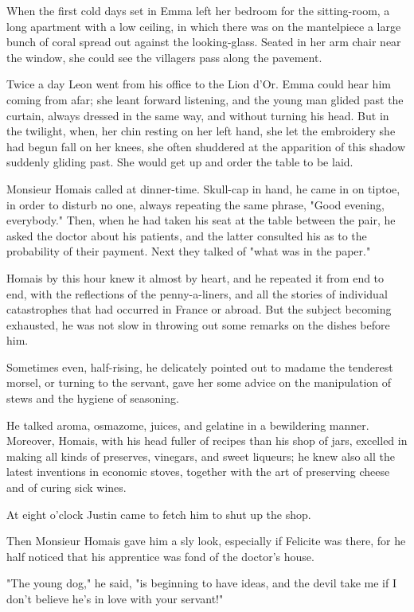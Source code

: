 \documentclass[11pt,twocolumn]{ltugboat}
\begin{document}
When the first cold days set in Emma left her bedroom for the
sitting-room, a long apartment with a low ceiling, in which there was
on the mantelpiece a large bunch of coral spread out against the
looking-glass. Seated in her arm chair near the window, she could see
the villagers pass along the pavement.

Twice a day Leon went from his office to the Lion d'Or. Emma could hear
him coming from afar; she leant forward listening, and the young man
glided past the curtain, always dressed in the same way, and without
turning his head. But in the twilight, when, her chin resting on her
left hand, she let the embroidery she had begun fall on her knees, she
often shuddered at the apparition of this shadow suddenly gliding past.
She would get up and order the table to be laid.

Monsieur Homais called at dinner-time. Skull-cap in hand, he came in on
tiptoe, in order to disturb no one, always repeating the same phrase,
"Good evening, everybody." Then, when he had taken his seat at the table
between the pair, he asked the doctor about his patients, and the latter
consulted his as to the probability of their payment. Next they talked
of "what was in the paper."

Homais by this hour knew it almost by heart, and he repeated it from end
to end, with the reflections of the penny-a-liners, and all the stories
of individual catastrophes that had occurred in France or abroad. But
the subject becoming exhausted, he was not slow in throwing out some
remarks on the dishes before him.

Sometimes even, half-rising, he delicately pointed out to madame the
tenderest morsel, or turning to the servant, gave her some advice on the
manipulation of stews and the hygiene of seasoning.

He talked aroma, osmazome, juices, and gelatine in a bewildering manner.
Moreover, Homais, with his head fuller of recipes than his shop of jars,
excelled in making all kinds of preserves, vinegars, and sweet liqueurs;
he knew also all the latest inventions in economic stoves, together with
the art of preserving cheese and of curing sick wines.

At eight o'clock Justin came to fetch him to shut up the shop.

Then Monsieur Homais gave him a sly look, especially if Felicite was
there, for he half noticed that his apprentice was fond of the doctor's
house.

"The young dog," he said, "is beginning to have ideas, and the devil
take me if I don't believe he's in love with your servant!"
\end{document}
